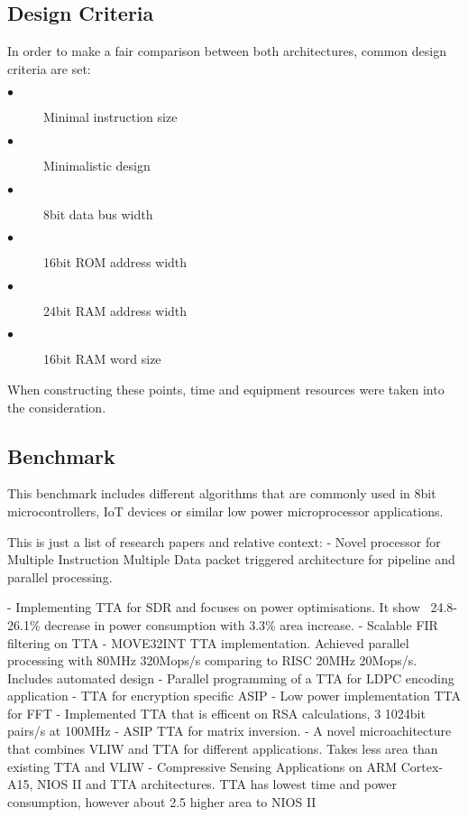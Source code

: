 \subsection{Design Criteria}
In order to make a fair comparison between both architectures, common design criteria are set:
\begin{description}
	\item[$\bullet$] Minimal instruction size
	\item[$\bullet$] Minimalistic design
	\item[$\bullet$] 8bit data bus width
	\item[$\bullet$] 16bit ROM address width
	\item[$\bullet$] 24bit RAM address width
	\item[$\bullet$] 16bit RAM word size
\end{description}
When constructing these points, time and equipment resources were taken into the consideration. 

\subsection{Benchmark}
This benchmark includes different algorithms that are commonly used in 8bit microcontrollers, IoT devices or similar low power microprocessor applications.


\iffalse
This is just a list of research papers and relative context:
\autocite{5936440} - Novel processor for Multiple Instruction Multiple Data packet triggered architecture for pipeline and parallel processing.


\autocite{7363689} - Implementing TTA for SDR and focuses on power optimisations. It show ~24.8-26.1\% decrease in power consumption with 3.3\% area increase.
\autocite{1511285} - Scalable FIR filtering on TTA
\autocite{289981} - MOVE32INT TTA implementation. Achieved parallel processing with 80MHz 320Mops/s comparing to RISC 20MHz 20Mops/s. Includes automated design
\autocite{6855236} - Parallel programming of a TTA for LDPC encoding application
\autocite{922340} - TTA for encryption specific ASIP
\autocite{8682289} - Low power implementation TTA for FFT
\autocite{6128530} - Implemented TTA that is efficent on RSA calculations, 3 1024bit pairs/s at 100MHz
\autocite{1540373} - ASIP TTA for matrix inversion.
\autocite{6403142} - A novel microachitecture that combines VLIW and TTA for different applications. Takes less area than existing TTA and VLIW
\autocite{8573494} - Compressive Sensing Applications on ARM Cortex-A15, NIOS II and TTA architectures. TTA has lowest time and power consumption, however about 2.5 higher area to NIOS II

